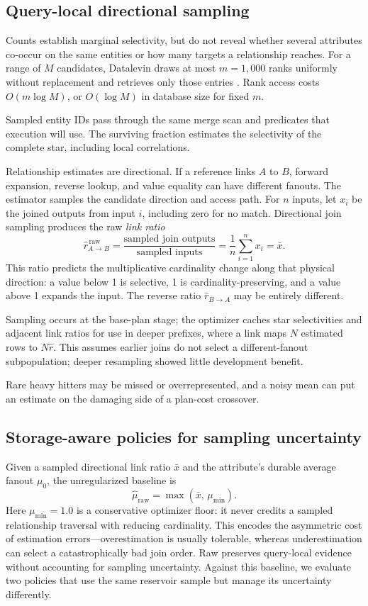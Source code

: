 \documentclass[sigconf]{cidr-2027}
\begin{document}
\subsection{Query-local directional sampling}

Counts establish marginal selectivity, but do not reveal whether several
attributes co-occur on the same entities or how many targets a relationship
reaches. For a range of $M$ candidates, Datalevin draws at most $m=1{,}000$
ranks uniformly without replacement and retrieves only those entries
\cite{vitter1985random}. Rank access costs $O(m\log M)$, or $O(\log M)$ in
database size for fixed $m$.

Sampled entity IDs pass through the same merge scan and
predicates that execution will use. The surviving fraction estimates the
selectivity of the complete star, including local correlations.

Relationship estimates are directional. If a reference links $A$ to $B$,
forward expansion, reverse lookup, and value equality can have different
fanouts. The estimator samples the candidate direction and access path. For
$n$ inputs, let $x_i$ be the joined outputs from input $i$, including zero for
no match. Directional join sampling produces the raw \emph{link ratio}
\[
  \widehat{r}^{\,\mathrm{raw}}_{A\rightarrow B}
  = \frac{\text{sampled join outputs}}{\text{sampled inputs}}
  = \frac{1}{n}\sum_{i=1}^{n}x_i
  = \bar{x}.
\]
This ratio predicts the multiplicative cardinality change along that physical
direction: a value below 1 is selective, 1 is cardinality-preserving, and a
value above 1 expands the input. The reverse ratio
$\widehat{r}_{B\rightarrow A}$ may be entirely different.

Sampling occurs at the base-plan stage; the optimizer caches star
selectivities and adjacent link ratios for use in deeper prefixes, where a
link maps $N$ estimated rows to $N\widehat{r}$. This assumes earlier joins do
not select a different-fanout subpopulation; deeper resampling showed little
development benefit.

Rare heavy hitters may be missed or overrepresented, and a noisy mean can put
an estimate on the damaging side of a plan-cost crossover.

\subsection{Storage-aware policies for sampling uncertainty}
\label{sec:uncertainty}

Given a sampled directional link ratio $\bar{x}$ and the attribute's durable
average fanout $\mu_0$, the unregularized baseline is
\[
  \widehat{\mu}_{\mathrm{raw}} =
  \max\!\left(\bar{x},\,\mu_{\min}\right).
\]
Here $\mu_{\min}=1.0$ is a conservative optimizer floor: it never credits a
sampled relationship traversal with reducing cardinality. This encodes the
asymmetric cost of estimation errors---overestimation is usually tolerable,
whereas underestimation can select a catastrophically bad join order. Raw
preserves query-local evidence without accounting for sampling uncertainty.
Against this baseline, we evaluate two policies that use the same reservoir
sample but manage its uncertainty differently.
\end{document}
